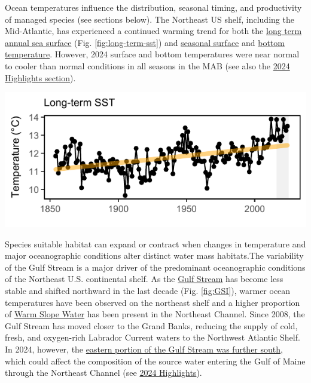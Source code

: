 \documentclass[
  10pt,
]{article}
\let\origfigure\figure
\let\endorigfigure\endfigure
\renewenvironment{figure}[1][2] {
    \expandafter\origfigure\expandafter[H]
} {
    \endorigfigure
}
\begin{document}
Ocean temperatures influence the distribution, seasonal timing, and productivity of managed species (see sections below). The Northeast US shelf, including the Mid-Atlantic, has experienced a continued warming trend for both the \href{https://noaa-edab.github.io/catalog/long_term_sst.html}{long term annual sea surface} (Fig. \ref{fig:long-term-sst}) and \href{https://noaa-edab.github.io/catalog/seasonal_oisst_anom.html}{seasonal surface} and \href{https://noaa-edab.github.io/catalog/bottom_temp_model_anom.html}{bottom temperature}. However, 2024 surface and bottom temperatures were near normal to cooler than normal conditions in all seasons in the MAB (see also the \hyperref[highlights]{2024 Highlights section}).

\begin{figure}

{\centering \includegraphics{midatlantic_files/figure-latex/long-term-sst-1} 

}

\caption{Northeast US annual sea surface temperature (SST, black), with increasing trend (orange).}\label{fig:long-term-sst}
\end{figure}

Species suitable habitat can expand or contract when changes in temperature and major oceanographic conditions alter distinct water mass habitats.The variability of the Gulf Stream is a major driver of the predominant oceanographic conditions of the Northeast U.S. continental shelf. As the \href{https://noaa-edab.github.io/catalog/gsi.html}{Gulf Stream} has become less stable and shifted northward in the last decade (Fig. \ref{fig:GSI}), warmer ocean temperatures have been observed on the northeast shelf and a higher proportion of \href{https://noaa-edab.github.io/catalog/slopewater.html}{Warm Slope Water} has been present in the Northeast Channel. Since 2008, the Gulf Stream has moved closer to the Grand Banks, reducing the supply of cold, fresh, and oxygen-rich Labrador Current waters to the Northwest Atlantic Shelf. In 2024, however, the \href{https://noaa-edab.github.io/catalog/gsi.html}{eastern portion of the Gulf Stream was further south}, which could affect the composition of the source water entering the Gulf of Maine through the Northeast Channel (see \hyperref[highlights]{2024 Highlights}).
\end{document}
